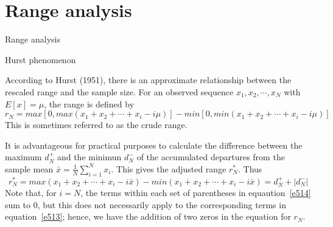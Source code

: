 \documentclass[8pt]{beamer}
\renewcommand{\emph}[1]{\textcolor{myorange}{#1}}
\begin{document}
\section{Range analysis}
\begin{frame}{Range analysis}
    \begin{block}{Hurst phenomenon}
    \end{block}
    According to Hurst (1951), there is an approximate relationship  between the \emph{rescaled range} and the \emph{sample size}. For an observed sequence $x_1, x_2, \cdots, x_N$ with $E[x]= \mu$, the range is defined by 
    \begin{equation}
        r_N = max\left[0, max(x_1 + x_2 + \cdots + x_i - i\mu) \right] - min\left[0, min(x_1 + x_2 + \cdots + x_i - i\mu) \right] 
    \label{e513}
    \end{equation}
    This is sometimes referred to as the \emph{crude range}.

    It is advantageous for practical purposes to calculate the difference between the \emph{maximum} $d_N^+$ and the \emph{minimun}  $d_N^-$ of the accumulated departures from the sample mean $\bar{x} = \frac{1}{N} \sum_{i=1}^N x_i$. This gives the adjusted range $r_N^*$. Thus
\begin{equation}
r_N^* =  max(x_1 + x_2 + \cdots + x_i - i\bar{x})-min(x_1 + x_2 + \cdots + x_i - i\bar{x}) = d_N^+ + |d_N^-| 
    \label{e514}
    \end{equation}
    Note that, for $i=N$, the terms within each set of parentheses in equaution~\ref{e514} sum to 0, but this does not necessarily apply to the corresponding terms in equation~\ref{e513}; hence, we have the addition of two zeros in the equation for $r_N$. 


\end{frame}
\end{document}

